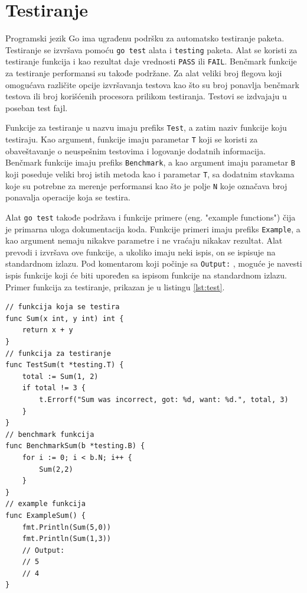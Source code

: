 \documentclass[12pt,oneside]{memoir}
\begin{document}
\section{Testiranje}

Programski jezik Go ima ugrađenu podršku za automatsko testiranje paketa. Testiranje se izvršava pomoću \texttt{go test} alata i \texttt{testing} paketa. Alat se koristi za testiranje funkcija i kao rezultat daje vrednosti \texttt{PASS} ili \texttt{FAIL}. Benčmark funkcije za testiranje performansi su takođe podržane. Za alat veliki broj flegova koji omogućava različite opcije izvršavanja testova kao što su broj ponavlja benčmark testova ili broj korišćenih procesora prilikom testiranja. Testovi se izdvajaju u poseban test fajl. 

Funkcije za testiranje u nazvu imaju prefiks \texttt{Test}, a zatim naziv funkcije koju testiraju. Kao argument, funkcije imaju parametar \texttt{T} koji se koristi za obaveštavanje o neuspešnim testovima i logovanje dodatnih informacija. Benčmark funkcije imaju prefiks \texttt{Benchmark}, a kao argument imaju parametar \texttt{B} koji poseduje veliki broj istih metoda kao i parametar \texttt{T}, sa dodatnim stavkama koje su potrebne za merenje performansi kao što je polje \texttt{N} koje označava broj ponavalja operacije koja se testira.

Alat \texttt{go test} takođe podržava i funkcije primere (eng. "example functions") čija je primarna uloga dokumentacija koda. Funkcije primeri imaju prefiks  \texttt{Example}, a kao argument nemaju nikakve parametre i ne vraćaju nikakav rezultat. Alat prevodi i izvršava ove funkcije, a ukoliko imaju neki ispis, on se ispisuje na standardnom izlazu. Pod komentarom koji počinje sa \texttt{Output:} , moguće je navesti ispis funkcije koji će biti upoređen sa ispisom funkcije na standardnom izlazu. Primer funkcija za testiranje, prikazan je u listingu \ref{lst:test}.

\begin{center}
\begin{lstlisting}[caption=Primer različitih tipova funkcija za testiranje, label={lst:test},  backgroundcolor=\color{background}]
// funkcija koja se testira
func Sum(x int, y int) int {  
	return x + y
}
// funkcija za testiranje
func TestSum(t *testing.T) {  
	total := Sum(1, 2)
	if total != 3 {
		t.Errorf("Sum was incorrect, got: %d, want: %d.", total, 3)
	}
}
// benchmark funkcija
func BenchmarkSum(b *testing.B) {
	for i := 0; i < b.N; i++ {
		Sum(2,2)
	}
}
// example funkcija
func ExampleSum() {
	fmt.Println(Sum(5,0))
	fmt.Println(Sum(1,3))
	// Output:
	// 5
	// 4
}

\end{lstlisting}
\end{center}
\end{document}
